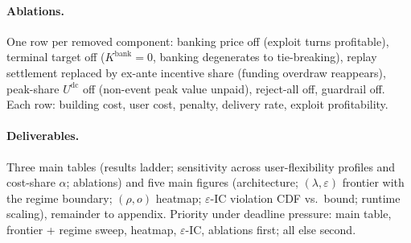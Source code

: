 \documentclass[letterpaper]{article}
\newcommand{\Udc}{U^{\mathrm{dc}}}                  %
\begin{document}
\paragraph{Ablations.} One row per removed component: banking price off
(exploit turns profitable), terminal target off ($K^{\mathrm{bank}}{=}  0$,
banking degenerates to tie-breaking), replay settlement replaced by
ex-ante incentive share (funding overdraw reappears), peak-share $\Udc$
off (non-event peak value unpaid), reject-all off, guardrail off. Each
row: building cost, user cost, penalty, delivery rate, exploit
profitability.

\paragraph{Deliverables.} Three main tables (results ladder; sensitivity
across user-flexibility profiles and cost-share $\alpha$; ablations) and
five main figures (architecture; $(\lambda,\varepsilon)$ frontier with
the regime boundary; $(\rho,o)$ heatmap; $\varepsilon$-IC violation CDF
vs.\ bound; runtime scaling), remainder to appendix. Priority under
deadline pressure: main table, frontier + regime sweep, heatmap,
$\varepsilon$-IC, ablations first; all else second.



\end{document}

